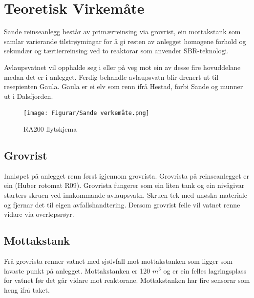 \newpage
\section{Teoretisk Virkemåte}
\thispagestyle{fancy}




Sande reinseanlegg består av primærreinsing via grovrist, ein mottakstank 
som samlar varierande tilstrøymingar for å gi resten av anlegget homogene forhold og
sekundær og tærtierreinsing ved to reaktorar som anvender SBR-teknologi.

Avlaupsvatnet vil opphalde seg i eller på veg mot ein av desse fire hovuddelane medan det er i anlegget.
Ferdig behandle avlaupsvatn blir drenert ut til resepienten Gaula. 
Gaula er ei elv som renn ifrå Hestad, forbi Sande og munner ut i Dalsfjorden.

\begin{figure}[htbp]
    \centering
    \texttt{[image: Figurar/Sande verkemåte.png]}
    \caption{RA200 flytskjema}\label{fig:HMI}
\end{figure}

\subsection{Grovrist}
Innløpet på anlegget renn først igjennom grovrista. Grovrista på reinseanlegget
er ein (Huber rotomat R09). Grovrista fungerer som ein liten tank og ein nivågivar starters
skruen ved innkommande avlaupsvatn. Skruen tek med unøska materiale og fjernar det til eigen avfallshandtering.
Dersom grovrist feile vil vatnet renne vidare via overløpsrøyr.

\newpage
\subsection{Mottakstank}
Frå grovrista renner vatnet med sjølvfall mot mottakstanken som ligger som lavaste punkt på anlegget.
Mottakstanken er 120 $m^3$ og er ein felles lagringsplass for vatnet før det går vidare mot reaktorane.
Mottakstanken har fire sensorar som heng ifrå taket.

